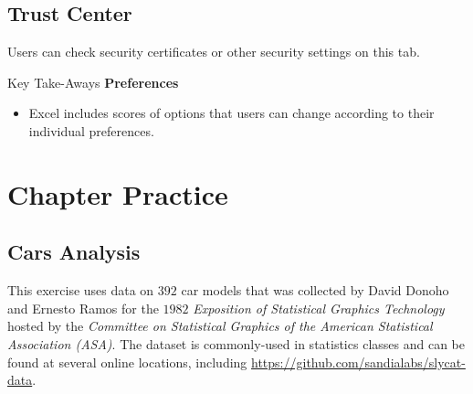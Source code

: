 \subsection{Trust Center}

Users can check security certificates or other security settings on this tab.

\begin{center}
	\begin{tkwbox}{Key Take-Aways}
		\textbf{Preferences}
		\\
		\begin{itemize}
			\setlength{\itemsep}{0pt}
			\setlength{\parskip}{0pt}
			\setlength{\parsep}{0pt}
			
			\item Excel includes scores of options that users can change according to their individual preferences.
			
		\end{itemize}
	\end{tkwbox}
\end{center}

\section{Chapter Practice}

\subsection{Cars Analysis}

This exercise uses data on $ 392 $ car models that was collected by David Donoho and Ernesto Ramos for the $ 1982 $ \textit{Exposition of Statistical Graphics Technology} hosted by the \textit{Committee on Statistical Graphics of the American Statistical Association (ASA)}. The dataset is commonly-used in statistics classes and can be found at several online locations, including \url{https://github.com/sandialabs/slycat-data}.

